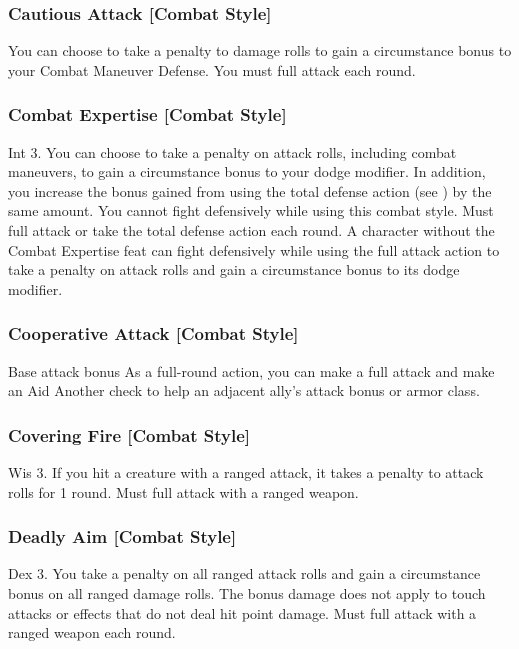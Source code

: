 \subsubsection{Cautious Attack [Combat Style]}
 You can choose to take a  penalty to damage rolls to gain a  circumstance bonus to your Combat Maneuver Defense. \bonusscalingdescription
{} You must full attack each round.

\subsubsection{Combat Expertise [Combat Style]}
 Int 3.
 You can choose to take a  penalty on attack rolls, including combat maneuvers, to gain a  circumstance bonus to your dodge modifier. \bonusscalingdescription In addition, you increase the bonus gained from using the total defense action (see ) by the same amount. You cannot fight defensively while using this combat style.
 Must full attack or take the total defense action each round.
 A character without the Combat Expertise feat can fight defensively while using the full attack action to take a  penalty on attack rolls and gain a  circumstance bonus to its dodge modifier.

\subsubsection{Cooperative Attack [Combat Style]}
 Base attack bonus 
 As a full-round action, you can make a full attack and make an Aid Another check to help an adjacent ally's attack bonus or armor class.

\subsubsection{Covering Fire [Combat Style]}
 Wis 3.
 If you hit a creature with a ranged attack, it takes a  penalty to attack rolls for 1 round.
 Must full attack with a ranged weapon.

\subsubsection{Deadly Aim [Combat Style]}
 Dex 3.
 You take a  penalty on all ranged attack rolls and gain a  circumstance bonus on all ranged damage rolls. \bonusscalingdescription The bonus damage does not apply to touch attacks or effects that do not deal hit point damage.
 Must full attack with a ranged weapon each round.

